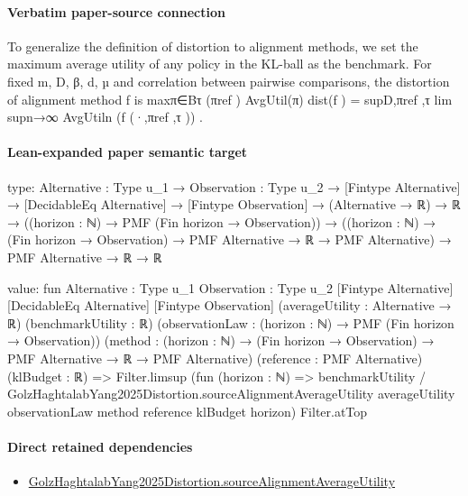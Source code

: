 \documentclass[10pt]{article}
\begin{document}
\paragraph{Verbatim paper-source connection}
\begin{ReviewVerbatim}
To generalize the definition of distortion to alignment methods, we set the maximum average utility of
any policy in the KL-ball as the benchmark. For fixed m, D, β, d, µ and correlation between pairwise
comparisons, the distortion of alignment method f is
                                                             maxπ∈Bτ (πref ) AvgUtil(π)
                      dist(f ) = supD,πref ,τ lim supn→∞       AvgUtiln (f (·,πref ,τ )) .
\end{ReviewVerbatim}



\paragraph{Lean-expanded paper semantic target}
\begin{ReviewVerbatim}
type:
{Alternative : Type u_1} →
  {Observation : Type u_2} →
    [Fintype Alternative] →
      [DecidableEq Alternative] →
        [Fintype Observation] →
          (Alternative → ℝ) →
            ℝ →
              ((horizon : ℕ) → PMF (Fin horizon → Observation)) →
                ((horizon : ℕ) → (Fin horizon → Observation) → PMF Alternative → ℝ → PMF Alternative) →
                  PMF Alternative → ℝ → ℝ

value:
fun {Alternative : Type u_1} {Observation : Type u_2} [Fintype Alternative] [DecidableEq Alternative]
    [Fintype Observation] (averageUtility : Alternative → ℝ) (benchmarkUtility : ℝ)
    (observationLaw : (horizon : ℕ) → PMF (Fin horizon → Observation))
    (method : (horizon : ℕ) → (Fin horizon → Observation) → PMF Alternative → ℝ → PMF Alternative)
    (reference : PMF Alternative) (klBudget : ℝ) =>
  Filter.limsup
    (fun (horizon : ℕ) =>
      benchmarkUtility /
        GolzHaghtalabYang2025Distortion.sourceAlignmentAverageUtility averageUtility observationLaw method reference
          klBudget horizon)
    Filter.atTop
\end{ReviewVerbatim}

\paragraph{Direct retained dependencies}
\begin{itemize}\raggedright
\item \hyperlink{paper-prerequisite-e2a06898e9a1c2db}{Golz\allowbreak{}Haghtalab\allowbreak{}Yang2025\allowbreak{}Distortion.\allowbreak{}source\allowbreak{}Alignment\allowbreak{}Average\allowbreak{}Utility}
\end{itemize}
\end{document}
